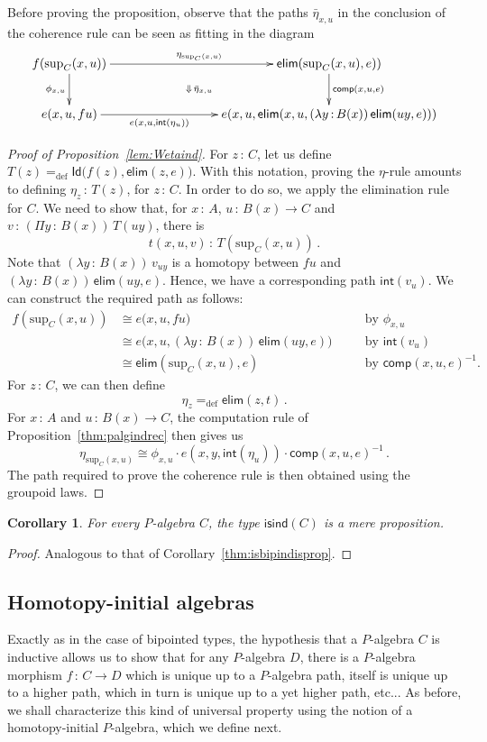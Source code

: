 \documentclass[10pt,a4paper,oneside,reqno]{amsart}
\numberwithin{equation}{section}
\theoremstyle{mythm}
\newtheorem{corollary}[theorem]{Corollary}
\theoremstyle{mydef}
\theoremstyle{myrmk}
\newcommand{\by}[1]{\quad&&\text{by {$#1$}}}
\newcommand{\defeq}{=_{\mathrm{def}}}
\newcommand{\co}{\,{:}\,}
\newcommand{\iso}{\cong}
\newcommand{\isind}{\mathsf{isind}}
\renewcommand{\int}{\mathsf{int}}
\newcommand{\Id}{\mathsf{Id}}
\newcommand{\elim}{\mathsf{elim}}
\newcommand{\comp}{\mathsf{comp}}
\renewcommand{\sup}{\mathrm{sup}}
\begin{document}
Before proving the proposition, observe that the paths $\bar{\eta}_{x,u}$ in the conclusion of the
coherence rule can be seen as fitting in the
diagram
\[
\xymatrix@C=3cm{
f(\sup_C(x,u)) \ar[r]^{\eta_{\sup_C(x,u)}} \ar[d]_{\phi_{x,u}} 
\ar@{}[dr]|{\Downarrow \, \bar{\eta}_{x,u}} & \elim(\sup_C(x,u), e))    \ar[d]^{\comp(x,u,e)} \\
 e(x,u,fu) \ar[r]_-{e(x,u, \int( \eta_u))} & e(x, u, \elim(x,u, (\lambda y \co B(x)) \, \elim(uy, e) )) }
\]



\begin{proof}[Proof of Proposition~\ref{lem:Wetaind}]  For $z \co C$, let us define $T(z) \defeq \Id \big(   f(z), \elim(z,e))$. With this notation, proving
 the $\eta$-rule amounts to defining $\eta_z \co T(z)$, for $z \co C$. In order to do so, we apply
the elimination rule for $C$. We need to show that, for $x \co A$, $u \co B(x) \to C$ and~$v \co 
(\Pi y \co B(x)) \, T(uy)$, there 
is 
\[
t(x,u,v) \co   T(\sup_C(x,u)) \, .
\]
Note that $(\lambda y \co B(x)) \, v_{uy}$ is a homotopy between $fu$ and $(\lambda y \co B(x)) \, \elim(uy, e)$.
Hence, we have a corresponding path $\int(v_u)$. We can construct the required path  as follows:
\begin{align*}
f(\sup_C(x,u)) &\iso e\big(x,u , f u \big)   \by{\phi_{x,u}}\\
	&\iso e\big(x,u, (\lambda y \co B(x) )\, \elim(u y ,e) \big) \by{\int( v_u)} \\
	& \iso \elim(\sup_C(x,u),e) \by{\comp(x,u,e)^{-1}}.
\end{align*}
For $z \co C$, we can then define
\[
\eta_z \defeq \elim(z,t) \, .
\] 
For $x \co A$ and $u \co B(x) \to C$, the  computation rule of Proposition~\ref{thm:palgindrec} then gives us
\[
 \eta_{\sup_C(x,u)} \iso \phi_{x,u} \cdot e(x,y,\int(  \eta_u ))  \cdot  \comp(x,u,e)^{-1} \, .
\]
The path required to prove  the coherence rule is then obtained using the groupoid laws.
\end{proof}


\begin{corollary} For every $P$-algebra $C$, the type $\isind(C)$ is a mere proposition.
\end{corollary}

\begin{proof} Analogous to that of Corollary~\ref{thm:isbipindisprop}.
\end{proof} 

\subsection*{Homotopy-initial algebras}
Exactly as in the case of bipointed types, the hypothesis that a $P$-algebra $C$ is inductive allows us to show that for any
$P$-algebra $D$, there is a $P$-algebra morphism $f \co C \to D$ which is unique up to a $P$-algebra path, itself is unique up 
to a higher path, which in turn is unique up to a yet higher path, etc... As before, we shall characterize this kind of universal property
using the notion of a homotopy-initial $P$-algebra, which we define next.
\end{document}
